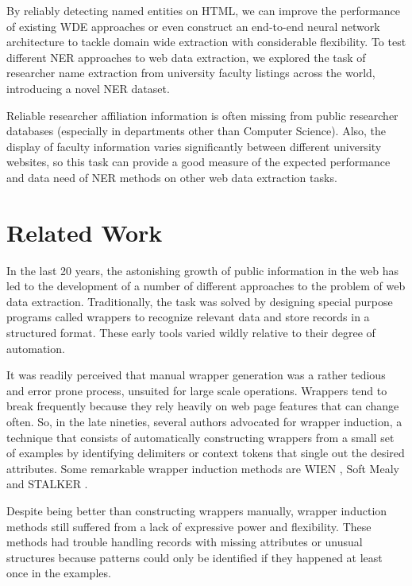 \documentclass{nle}
\begin{document}
By reliably detecting named entities on HTML, we can improve the performance of existing WDE 
approaches or even construct an end-to-end neural network architecture to tackle domain 
wide extraction with considerable flexibility. To test different NER approaches to
web data extraction, we explored the task of researcher name extraction from university 
faculty listings across the world, introducing a novel NER dataset.

Reliable researcher affiliation information is often missing from public researcher 
databases (especially in departments other than Computer Science). Also, the display of 
faculty information varies significantly between different university websites, so 
this task can provide a good measure of the expected performance and data need of
NER methods on other web data extraction tasks. 


\section{Related Work}

In the last 20 years, the astonishing growth of public information in the web has 
led to the development of a number of different approaches to the problem of web 
data extraction. Traditionally, the task was solved by designing special purpose
programs called wrappers to recognize relevant data and store records in a structured
format. These early tools varied wildly relative to their degree of automation. 

It was readily perceived that manual wrapper generation was a rather tedious and
error prone process, unsuited for large scale operations. Wrappers tend to
break frequently because they rely heavily on web page features that can change 
often. So, in the late nineties, several authors advocated for wrapper induction, a technique 
that consists of automatically constructing wrappers from a small set of examples by 
identifying delimiters or context tokens that single out the desired attributes. 
Some remarkable wrapper induction methods are WIEN \cite{Kushmerick2000}, Soft 
Mealy \cite{Hsu1998} and STALKER \cite{Muslea1999}.

Despite being better than constructing wrappers manually, wrapper induction methods 
still suffered from a lack of expressive power and flexibility. These methods had 
trouble handling records with missing attributes or unusual structures because
patterns could only be identified if they happened at least once in the examples.
\end{document}
